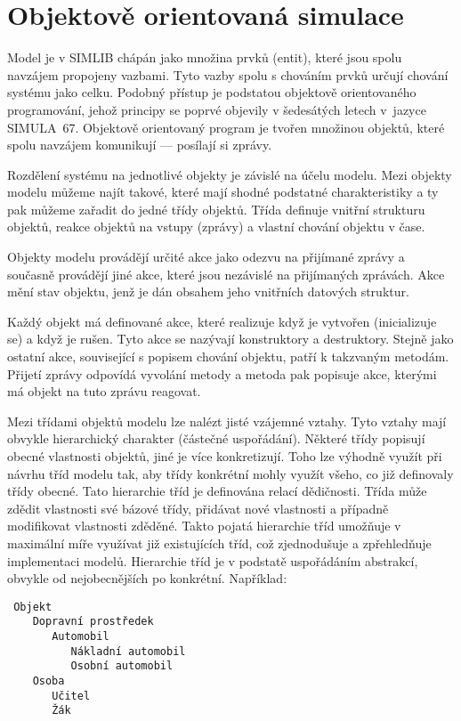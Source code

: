 \documentclass[a4paper]{article}
\begin{document}
\section{Objektově orientovaná simulace}

Model je v SIMLIB chápán jako množina prvků (entit), které jsou spolu
navzájem propojeny vazbami. Tyto vazby spolu s chováním prvků určují chování
systému jako celku. Podobný přístup je podstatou objektově orientovaného
programování, jehož principy se poprvé objevily v šedesátých letech
v~jazyce SIMULA~67. Objektově orientovaný program je tvořen množinou objektů,
které spolu navzájem komunikují --- posílají si zprávy.

Rozdělení systému na jednotlivé objekty je závislé
na účelu modelu. Mezi objekty modelu můžeme najít takové, které
mají shodné podstatné charakteristiky a ty pak můžeme zařadit do
jedné třídy objektů. Třída definuje vnitřní strukturu objektů,
reakce objektů na vstupy (zprávy) a vlastní chování objektu
v čase.

Objekty modelu provádějí určité akce jako odezvu na přijímané
zprávy a současně provádějí jiné akce, které jsou nezávislé na
přijímaných zprávách. Akce mění stav objektu, jenž je dán
obsahem jeho vnitřních datových struktur.

Každý objekt má definované akce, které realizuje když je
vytvořen (inicializuje se) a když je rušen. Tyto akce se
nazývají konstruktory a destruktory. Stejně jako ostatní akce,
související s popisem chování objektu, patří k takzvaným
metodám. Přijetí zprávy odpovídá vyvolání metody a metoda pak
popisuje akce, kterými má objekt na tuto zprávu reagovat.

Mezi třídami objektů modelu lze nalézt jisté vzájemné vztahy.
Tyto vztahy mají obvykle hierarchický charakter (částečné
uspořádání). Některé třídy popisují obecné vlastnosti objektů,
jiné je více konkretizují. Toho lze výhodně využít při návrhu
tříd modelu tak, aby třídy konkrétní mohly využít všeho, co již
definovaly třídy obecné. Tato hierarchie tříd je definována
relací dědičnosti. Třída může zdědit vlastnosti své bázové
třídy, přidávat nové vlastnosti a případně modifikovat
vlastnosti zděděné. Takto pojatá hierarchie tříd umožňuje
v maximální míře využívat již existujících tříd, což
zjednodušuje a zpřehledňuje implementaci modelů. Hierarchie tříd
je v podstatě uspořádáním abstrakcí, obvykle od nejobecnějších
po konkrétní. Například:

\begin{verbatim}
 Objekt
    Dopravní prostředek
       Automobil
          Nákladní automobil
          Osobní automobil
    Osoba
       Učitel
       Žák
\end{verbatim}
\end{document}
